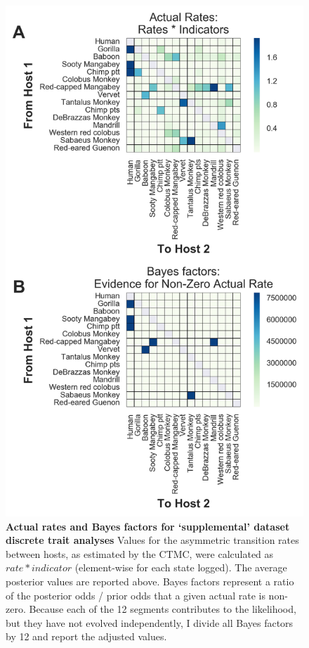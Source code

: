 \begin{figure}[h!]
  \begin{centering}
    \includegraphics[width=.6\linewidth]{./png/siv_suppdata_transmissions.png}
  	\caption[Pairwise host transmission rates (`supplemental' dataset)]{\textbf{Actual rates and Bayes factors for `supplemental' dataset discrete trait analyses }
Values for the asymmetric transition rates between hosts, as estimated by the CTMC, were calculated as $rate * indicator$ (element-wise for each state logged).
The average posterior values are reported above.
Bayes factors represent a ratio of the posterior odds / prior odds that a given actual rate is non-zero.
Because each of the 12 segments contributes to the likelihood, but they have not evolved independently, I divide all Bayes factors by 12 and report the adjusted values.
        }
  	\label{siv_suppdata_transmissions}
  \end{centering}
\end{figure}


